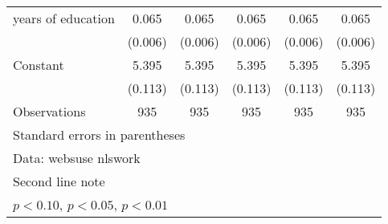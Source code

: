 \begin{table}[htbp]
\begin{tabular}{l*{5}{c}}
\addlinespace
years of education  &       0.065\sym{***}&       0.065\sym{***}&       0.065\sym{***}&       0.065\sym{***}&       0.065\sym{***}\\
                    &     (0.006)         &     (0.006)         &     (0.006)         &     (0.006)         &     (0.006)         \\
\addlinespace
Constant            &       5.395\sym{***}&       5.395\sym{***}&       5.395\sym{***}&       5.395\sym{***}&       5.395\sym{***}\\
                    &     (0.113)         &     (0.113)         &     (0.113)         &     (0.113)         &     (0.113)         \\
\midrule
Observations        &         935         &         935         &         935         &         935         &         935         \\
\bottomrule
\multicolumn{6}{l}{\footnotesize Standard errors in parentheses}\\
\multicolumn{6}{l}{\footnotesize Data: websuse nlswork}\\
\multicolumn{6}{l}{\footnotesize Second line note}\\
\multicolumn{6}{l}{\footnotesize \sym{*} \(p<0.10\), \sym{**} \(p<0.05\), \sym{***} \(p<0.01\)}\\
\end{tabular}
\end{table}

